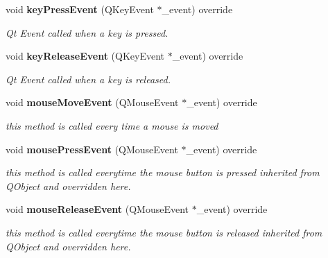 \begin{DoxyCompactItemize}
void \textbf{ key\+Press\+Event} (Q\+Key\+Event $\ast$\+\_\+event) override
\begin{DoxyCompactList}\small\item\em Qt Event called when a key is pressed. \end{DoxyCompactList}\item 
void \textbf{ key\+Release\+Event} (Q\+Key\+Event $\ast$\+\_\+event) override
\begin{DoxyCompactList}\small\item\em Qt Event called when a key is released. \end{DoxyCompactList}\item 
void \textbf{ mouse\+Move\+Event} (Q\+Mouse\+Event $\ast$\+\_\+event) override
\begin{DoxyCompactList}\small\item\em this method is called every time a mouse is moved \end{DoxyCompactList}\item 
void \textbf{ mouse\+Press\+Event} (Q\+Mouse\+Event $\ast$\+\_\+event) override
\begin{DoxyCompactList}\small\item\em this method is called everytime the mouse button is pressed inherited from Q\+Object and overridden here. \end{DoxyCompactList}\item 
void \textbf{ mouse\+Release\+Event} (Q\+Mouse\+Event $\ast$\+\_\+event) override
\begin{DoxyCompactList}\small\item\em this method is called everytime the mouse button is released inherited from Q\+Object and overridden here. \end{DoxyCompactList}\end{DoxyCompactItemize}
